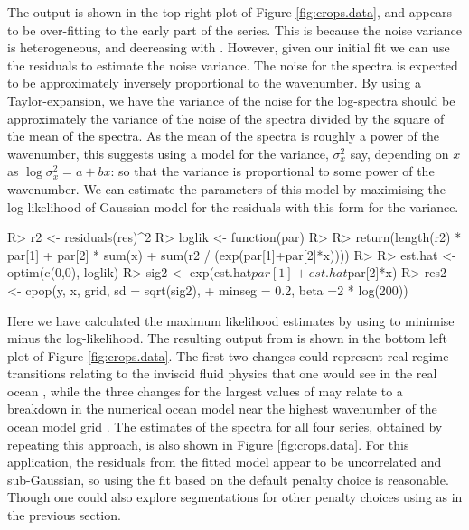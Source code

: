 \documentclass[nojss]{jss}
\begin{document}
The output is shown in the top-right plot of Figure \ref{fig:crops.data}, and appears to be over-fitting to the early part of the series. This is because the noise variance is heterogeneous, and decreasing with . However, given our initial fit we can use the residuals to estimate the noise variance. The noise for the spectra is expected to be approximately inversely proportional to the wavenumber. By using a Taylor-expansion, we have the variance of the noise for the log-spectra should be approximately the variance of the noise of the spectra divided by the square of the mean of the spectra. As the mean of the spectra is roughly a power of the wavenumber, this suggests using a model for the variance, $\sigma^2_x$ say, depending on $x$ as $\log \sigma^2_x = a + bx$: so that the variance is proportional to some power of the wavenumber. We can estimate the parameters of this model by maximising the log-likelihood of Gaussian model for the residuals with this form for the variance.
\begin{CodeChunk}
\begin{CodeInput}
R> r2 <- residuals(res)^2
R> loglik <- function(par)
R> { 
R>  return(length(r2) * par[1] + par[2] * sum(x) 
  + sum(r2 / (exp(par[1]+par[2]*x))))
R> }
R> est.hat <- optim(c(0,0), loglik)
R> sig2 <- exp(est.hat$par[1] + est.hat$par[2]*x)
R> res2 <- cpop(y, x, grid, sd = sqrt(sig2), 
+               minseg = 0.2, beta =2 * log(200))
\end{CodeInput}
\end{CodeChunk}
Here we have calculated the maximum likelihood estimates by using  to minimise minus the log-likelihood. The resulting output from  is shown in the bottom left plot of Figure \ref{fig:crops.data}.  The first two changes could represent real regime transitions relating to the inviscid fluid physics that one would see in the real ocean \cite[see Figure 6a of][]{callies2013interpreting}, while the three changes for the largest values of  may relate to a breakdown in the numerical ocean model near the highest wavenumber of the ocean model grid \cite[]{soufflet2016effective}. The estimates of the spectra for all four series, obtained by repeating this approach, is also shown in Figure \ref{fig:crops.data}. For this application, the residuals from the fitted model appear to be uncorrelated and sub-Gaussian, so using the fit based on the default penalty choice is reasonable. Though one could also explore segmentations for other penalty choices using  as in the previous section.
\end{document}
